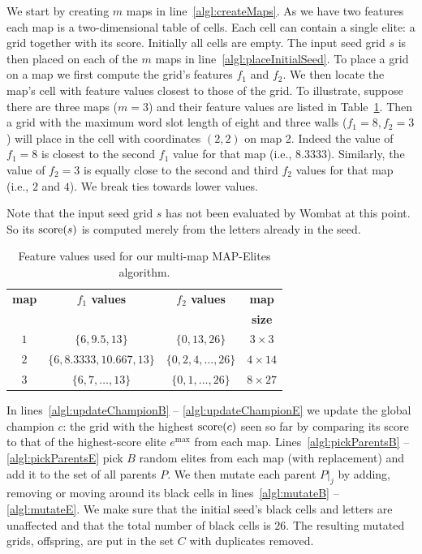 We start by creating $m$ maps in line~\ref{algl:createMaps}. As we have two features each map is a two-dimensional table of cells. Each cell can contain a single elite: a grid together with its score. Initially all cells are empty. The input seed grid $s$ is then placed on each of the $m$ maps in line~\ref{algl:placeInitialSeed}. To place a grid on a map we first compute the grid's features $f_1$ and $f_2$. We then locate the map's cell with feature values closest to those of the grid. To illustrate, suppose there are three maps ($m=3$) and their feature values are listed in Table~\ref{tab:mrme}. Then a grid with the maximum word slot length of eight and three walls ($f_1 = 8, f_2 = 3$) will place in the cell with coordinates $(2,2)$ on map 2. Indeed the value of $f_1 = 8$ is closest to the second $f_1$ value for that map (i.e., $8.3333$). Similarly, the value of $f_2 = 3$ is equally close to the second and third $f_2$ values for that map (i.e., $2$ and $4$). We break ties towards lower values. 

Note that the input seed grid $s$ has not been evaluated by {\sc Wombat} at this point. So its $\operatorname{score}(s)$ is computed merely from the letters already in the seed.

\begin{table}[htbp]
\caption{Feature values used for our multi-map MAP-Elites algorithm.}
\label{tab:mrme}
{\small\centering
\begin{tabular}{c|c|c|c}
\toprule
{\bf map} & {\bf $f_1$ values} & {\bf $f_2$ values} & {\bf map} \\
          &                    &                    & {\bf size} \\
\midrule
$1$ & $\{6,9.5,13\}$ & $\{0,13,26\}$ & $3 \times 3$ \\
$2$ & $\{6,8.3333,10.667,13\}$ & $\{0,2,4,\dots,26\}$ & $4 \times 14$\\
$3$ & $\{6,7,\dots,13\}$ & $\{0,1,\dots,26\}$ & $8 \times 27$\\
\bottomrule
\end{tabular}}
\end{table}

In lines~\ref{algl:updateChampionB} -- \ref{algl:updateChampionE} we update the global champion $c$: the grid with the highest $\operatorname{score}(c)$ seen so far by comparing its score to that of the highest-score elite $e^{\max}$ from each map. Lines~\ref{algl:pickParentsB} -- \ref{algl:pickParentsE} pick $B$ random elites from each map (with replacement) and add it to the set of all parents $P$. We then mutate each parent $\left.P\right|_j$ by adding, removing or moving around its black cells in lines~\ref{algl:mutateB} -- \ref{algl:mutateE}. We make sure that the initial seed's black cells and letters are unaffected and that the total number of black cells is $26$. The resulting mutated grids, offspring, are put in the set $C$ with duplicates removed.

